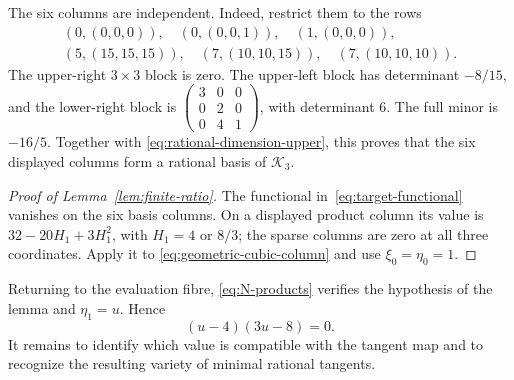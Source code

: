 The six columns are independent. Indeed, restrict them to the rows
\begin{gather*}
 (0,(0,0,0)),\quad (0,(0,0,1)),\quad (1,(0,0,0)),\\
 (5,(15,15,15)),\quad (7,(10,10,15)),\quad (7,(10,10,10)).
\end{gather*}
The upper-right $3\times3$ block is zero. The upper-left block has
determinant $-8/15$, and the lower-right block is
$\left(\begin{smallmatrix}3&0&0\\0&2&0\\0&4&1\end{smallmatrix}\right)$,
with determinant $6$. The full minor is $-16/5$. Together with
\eqref{eq:rational-dimension-upper}, this proves that the six
displayed columns form a rational basis of $\mathcal K_3$.

\begin{proof}[Proof of Lemma~\ref{lem:finite-ratio}]
The functional in~\eqref{eq:target-functional} vanishes on the six
basis columns. On a displayed product column its value
is $32-20H_1+3H_1^2$, with $H_1=4$ or $8/3$; the sparse columns
are zero at all three coordinates. Apply it to
\eqref{eq:geometric-cubic-column} and use $\xi_0=\eta_0=1$.
\end{proof}

Returning to the evaluation fibre, \eqref{eq:N-products} verifies
the hypothesis of the lemma and $\eta_1=u$. Hence
\[
 (u-4)(3u-8)=0.
\]
It remains to identify which value is compatible with the tangent
map and to recognize the resulting variety of minimal rational
tangents.
